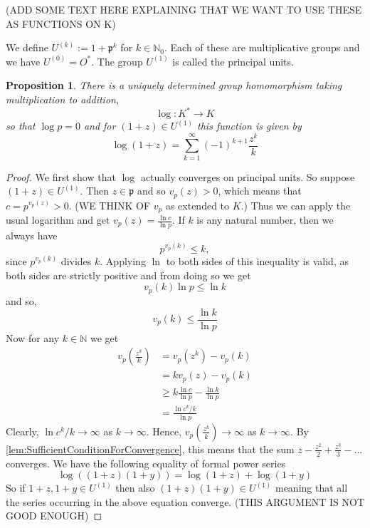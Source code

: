 \documentclass{article}
\newtheorem{proposition}{Proposition}[section]
\newcommand{\mfrak}[1]{\mathfrak{#1}}
\newcommand{\mbb}[1]{\mathbb{#1}}
\begin{document}
(ADD SOME TEXT HERE EXPLAINING THAT WE WANT TO USE THESE AS FUNCTIONS ON K)

We define $U^{(k)} := 1 + \mfrak p^k$ for $k \in \mbb N_0$. Each of these are multiplicative groups and we have $U^{(0)} = O^*$. The group $U^{(1)}$ is called the principal units. 

\begin{proposition}
    There is a uniquely determined group homomorphism taking multiplication to addition,
    $$\log : K^* \to K$$
    so that $\log p = 0$ and for $(1 + z) \in U^{(1)}$ this function is given by
    $$\log (1 + z) = \sum_{k = 1}^\infty (-1)^{k+1}\frac{z^k}{k}$$    
\end{proposition}
\begin{proof}
    We first show that $\log$ actually converges on principal units. So suppose $(1 + z) \in U^{(1)}$. Then $z \in \mfrak p$ and so $v_p(z) > 0$, which means that $c = p^{v_p(z)} > 0$. (WE THINK OF $v_p$ as extended to $K$.) Thus we can apply the usual logarithm and get $v_p(z) = \frac{\ln c}{\ln p}$. If $k$ is any natural number, then we always have $$p^{v_p(k)} \leq k,$$ since $p^{v_p(k)}$ divides $k$. Applying $\ln$ to both sides of this inequality is valid, as both sides are strictly positive and from doing so we get 
    $$v_p(k) \ln p \leq \ln k$$
    and so,
    $$v_p(k) \leq \frac{\ln k}{\ln p}$$
    Now for any $k \in \mbb N$ we get
    \begin{align*}
        v_p(\frac{z^k}{k}) &= v_p(z^k) - v_p(k)  \\
        &= kv_p(z) - v_p(k) \\
        &\geq k \frac{\ln c}{\ln p} - \frac{\ln k}{\ln p} \\
        &= \frac{\ln c^k / k}{\ln p}
    \end{align*}
    Clearly, $\ln c^k / k \to \infty$ as $k \to \infty$. Hence, $v_p(\frac{z^k}{k}) \to \infty$ as $k \to \infty$. By \cref{lem:SufficientConditionForConvergence}, this means that the sum $z - \frac{z^2}{2} + \frac{z^3}{3} - ...$ converges. We have the following equality of formal power series
    $$\log((1+z)(1+y)) = \log(1+z) + \log(1+y)$$
    So if $1+z, 1+y \in U^{(1)}$ then also $(1+z)(1+y) \in U^{(1)}$ meaning that all the series occurring in the above equation converge. (THIS ARGUMENT IS NOT GOOD ENOUGH)
    

\end{proof}
\end{document}
